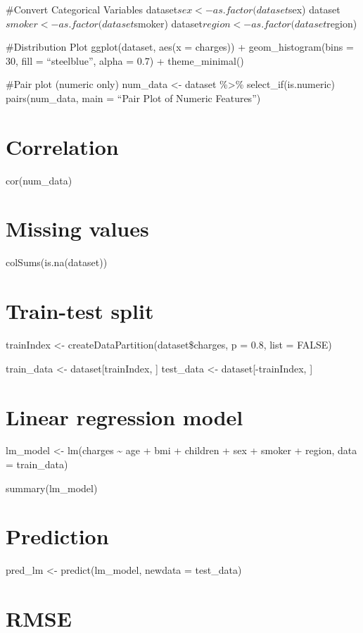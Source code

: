 \documentclass[
]{article}
\begin{document}
\#Convert Categorical Variables dataset\(sex <- as.factor(dataset\)sex)
dataset\(smoker <- as.factor(dataset\)smoker)
dataset\(region <- as.factor(dataset\)region)

\#Distribution Plot ggplot(dataset, aes(x = charges)) +
geom\_histogram(bins = 30, fill = ``steelblue'', alpha = 0.7) +
theme\_minimal()

\#Pair plot (numeric only) num\_data \textless- dataset \%\textgreater\%
select\_if(is.numeric) pairs(num\_data, main = ``Pair Plot of Numeric
Features'')

\section{Correlation}\label{correlation}

cor(num\_data)

\section{Missing values}\label{missing-values}

colSums(is.na(dataset))

\section{Train-test split}\label{train-test-split}

trainIndex \textless- createDataPartition(dataset\$charges, p = 0.8,
list = FALSE)

train\_data \textless- dataset{[}trainIndex, {]} test\_data \textless-
dataset{[}-trainIndex, {]}

\section{Linear regression model}\label{linear-regression-model}

lm\_model \textless- lm(charges \textasciitilde{} age + bmi + children +
sex + smoker + region, data = train\_data)

summary(lm\_model)

\section{Prediction}\label{prediction}

pred\_lm \textless- predict(lm\_model, newdata = test\_data)

\section{RMSE}\label{rmse}
\end{document}
